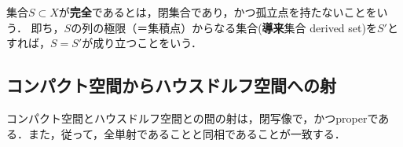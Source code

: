 \documentclass[uplatex,dvipdfmx]{jsreport}
\begin{document}
\begin{definition}
    集合$S\subset X$が\textbf{完全}であるとは，閉集合であり，かつ孤立点を持たないことをいう．
    即ち，$S$の列の極限（＝集積点）からなる集合(\textbf{導来}集合 derived set)を$S'$とすれば，$S=S'$が成り立つことをいう．
\end{definition}

\subsection{コンパクト空間からハウスドルフ空間への射}

\begin{tcolorbox}[colframe=ForestGreen, colback=ForestGreen!10!white, breakable ,colbacktitle=ForestGreen!40!white, coltitle=black,fonttitle=\bfseries\sffamily
    ,title=コンパクト空間とハウスドルフ空間との間のHom集合]
    コンパクト空間とハウスドルフ空間との間の射は，閉写像で，かつproperである．また，従って，全単射であることと同相であることが一致する．
\end{tcolorbox}
\end{document}
